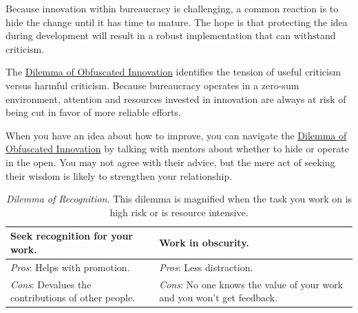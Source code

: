 Because innovation within bureaucracy is challenging, a common reaction is to hide the change until it has time to mature. The hope is that protecting the idea during development will result in a robust implementation that can withstand criticism. 

The \hyperref[table:dilemma-personal-innovate-open-obscure]{Dilemma of Obfuscated Innovation} identifies the tension of useful criticism versus harmful criticism. Because bureaucracy operates in a zero-sum environment, attention and resources invested in innovation are always at risk of being cut in favor of more reliable efforts. 

When you have an idea about how to improve, you can navigate the \hyperref[table:dilemma-personal-innovate-open-obscure]{Dilemma of Obfuscated Innovation} by talking with mentors about whether to hide or operate in the open. You may not agree with their advice, but the mere act of seeking their wisdom is likely to strengthen your relationship. 



\begin{center}
\begin{table}[H] %
\begin{tabular}{ | m{\dilemmatablewidth}| m{\dilemmatablewidth} | } 
  \hline
  \textbf{Seek recognition for your work.} &
  \textbf{Work in obscurity.} \\
  \hline
  \textit{Pros}: Helps with promotion. & 
  \textit{Pros}: Less distraction. \\
  \hline
  \textit{Cons}: Devalues the contributions of other people. & 
  \textit{Cons}: No one knows the value of your work and you won't get feedback. \\
  \hline
\end{tabular}
\caption{
\textit{Dilemma of Recognition.}
This dilemma is magnified when the task you work on is high risk or is resource intensive. 
}
\label{table:dilemma-personal-recognition-obscurity}
\end{table}
\end{center}

